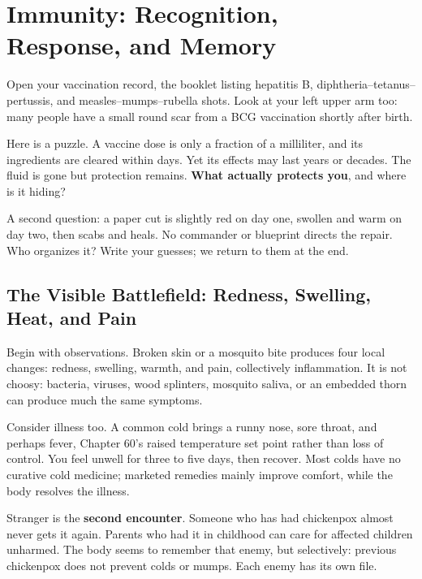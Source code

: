 \chapter[Immunity: Recognition, Response, and Memory]{Immunity: Recognition,\protect\\ Response, and Memory}

\begin{kaichang}
Open your vaccination record, the booklet listing hepatitis B, diphtheria--tetanus--pertussis, and measles--mumps--rubella shots. Look at your left upper arm too: many people have a small round scar from a BCG vaccination shortly after birth.

Here is a puzzle. A vaccine dose is only a fraction of a milliliter, and its ingredients are cleared within days. Yet its effects may last years or decades. The fluid is gone but protection remains. \textbf{What actually protects you}, and where is it hiding?

A second question: a paper cut is slightly red on day one, swollen and warm on day two, then scabs and heals. No commander or blueprint directs the repair. Who organizes it? Write your guesses; we return to them at the end.
\end{kaichang}

\section{The Visible Battlefield: Redness, Swelling, Heat, and Pain}

Begin with observations. Broken skin or a mosquito bite produces four local changes: redness, swelling, warmth, and pain, collectively inflammation. It is not choosy: bacteria, viruses, wood splinters, mosquito saliva, or an embedded thorn can produce much the same symptoms.

Consider illness too. A common cold brings a runny nose, sore throat, and perhaps fever, Chapter 60's raised temperature set point rather than loss of control. You feel unwell for three to five days, then recover. Most colds have no curative cold medicine; marketed remedies mainly improve comfort, while the body resolves the illness.

Stranger is the \textbf{second encounter}. Someone who has had chickenpox almost never gets it again. Parents who had it in childhood can care for affected children unharmed. The body seems to remember that enemy, but selectively: previous chickenpox does not prevent colds or mumps. Each enemy has its own file.

